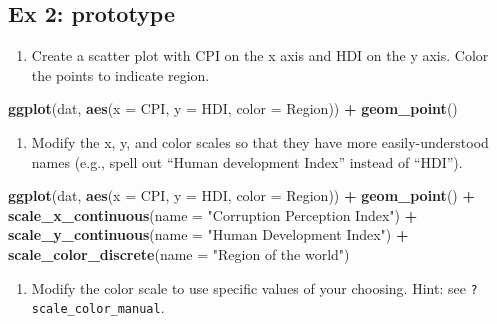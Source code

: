 \documentclass[]{book}
\newenvironment{Shaded}{\begin{snugshade}}{\end{snugshade}}
\newcommand{\KeywordTok}[1]{\textcolor[rgb]{0.13,0.29,0.53}{\textbf{#1}}}
\newcommand{\DataTypeTok}[1]{\textcolor[rgb]{0.13,0.29,0.53}{#1}}
\newcommand{\StringTok}[1]{\textcolor[rgb]{0.31,0.60,0.02}{#1}}
\newcommand{\OperatorTok}[1]{\textcolor[rgb]{0.81,0.36,0.00}{\textbf{#1}}}
\newcommand{\NormalTok}[1]{#1}
\providecommand{\tightlist}{%
  \setlength{\itemsep}{0pt}\setlength{\parskip}{0pt}}
\begin{document}
\subsection{Ex 2: prototype}\label{ex-2-prototype-1}

\begin{enumerate}
\def\labelenumi{\arabic{enumi}.}
\tightlist
\item
  Create a scatter plot with CPI on the x axis and HDI on the y axis.
  Color the points to indicate region.
\end{enumerate}

\begin{Shaded}
\begin{Highlighting}[]
\KeywordTok{ggplot}\NormalTok{(dat, }\KeywordTok{aes}\NormalTok{(}\DataTypeTok{x =}\NormalTok{ CPI, }\DataTypeTok{y =}\NormalTok{ HDI, }\DataTypeTok{color =}\NormalTok{ Region)) }\OperatorTok{+}
\StringTok{  }\KeywordTok{geom_point}\NormalTok{()}
\end{Highlighting}
\end{Shaded}

\begin{enumerate}
\def\labelenumi{\arabic{enumi}.}
\setcounter{enumi}{1}
\tightlist
\item
  Modify the x, y, and color scales so that they have more
  easily-understood names (e.g., spell out ``Human development Index''
  instead of ``HDI'').
\end{enumerate}

\begin{Shaded}
\begin{Highlighting}[]
\KeywordTok{ggplot}\NormalTok{(dat, }\KeywordTok{aes}\NormalTok{(}\DataTypeTok{x =}\NormalTok{ CPI, }\DataTypeTok{y =}\NormalTok{ HDI, }\DataTypeTok{color =}\NormalTok{ Region)) }\OperatorTok{+}
\KeywordTok{geom_point}\NormalTok{() }\OperatorTok{+}
\KeywordTok{scale_x_continuous}\NormalTok{(}\DataTypeTok{name =} \StringTok{"Corruption Perception Index"}\NormalTok{) }\OperatorTok{+}
\KeywordTok{scale_y_continuous}\NormalTok{(}\DataTypeTok{name =} \StringTok{"Human Development Index"}\NormalTok{) }\OperatorTok{+}
\KeywordTok{scale_color_discrete}\NormalTok{(}\DataTypeTok{name =} \StringTok{"Region of the world"}\NormalTok{)}
\end{Highlighting}
\end{Shaded}

\begin{enumerate}
\def\labelenumi{\arabic{enumi}.}
\setcounter{enumi}{2}
\tightlist
\item
  Modify the color scale to use specific values of your choosing. Hint:
  see \texttt{?scale\_color\_manual}.
\end{enumerate}
\end{document}
